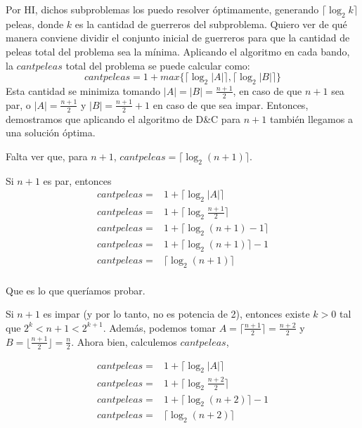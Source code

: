 Por HI, dichos subproblemas los puedo resolver óptimamente, generando $\lceil \log _2 k \rceil$ peleas, donde $k$ es la cantidad de guerreros del subproblema. Quiero ver de qué manera conviene dividir el conjunto inicial de guerreros para que la cantidad de peleas total del problema sea la mínima.
Aplicando el algoritmo en cada bando, la $cantpeleas$ total del problema se puede calcular como: 
\[ cantpeleas = 1 + max\{ \lceil \log _2 |A| \rceil , \lceil \log _2 |B| \rceil \}\]
Esta cantidad se minimiza tomando $|A| = |B| = \frac{n+1}{2}$, en caso de que $n+1$ sea par, o $|A| = \frac{n+1}{2}$ y $|B| = \frac{n+1}{2} + 1$ en caso de que sea impar. Entonces, demostramos que aplicando el algoritmo de D\&C para $n+1$ también llegamos a una solución óptima.

Falta ver que, para $n+1$,  $cantpeleas = \lceil \log _2 (n+1) \rceil$.

Si $n+1$ es par, entonces
  \begin{equation}
  \begin{aligned}
  cantpeleas =& 1 + \lceil \log _2 |A| \rceil \\
  cantpeleas =& 1 + \lceil \log _2 \frac{n+1}{2} \rceil \\
  cantpeleas =& 1 + \lceil \log _2 (n+1)  - 1 \rceil \\
  cantpeleas =& 1 + \lceil \log _2 (n+1) \rceil  - 1 \\
  cantpeleas =& \lceil \log _2 (n+1) \rceil \\
  \end{aligned}
  \end{equation}

Que es lo que queríamos probar.

Si $n + 1$ es impar (y por lo tanto, no es potencia de 2), entonces existe $k > 0$ tal que $2^k < n + 1 < 2^{k+1}$.
Además, podemos tomar
  $A = \lceil \frac{n+1}{2} \rceil = \frac{n+2}{2}$ y
  $B = \lfloor \frac{n+1}2 \rfloor = \frac{n}2$.
Ahora bien, calculemos $cantpeleas$,

  \begin{equation}
  \begin{aligned}
  cantpeleas =& 1 + \lceil \log _2 |A| \rceil \\
  cantpeleas =& 1 + \lceil \log _2 \frac{n+2}{2} \rceil \\
  cantpeleas =& 1 + \lceil \log _2 (n+2) \rceil  - 1 \\
  cantpeleas =& \lceil \log _2 (n+2) \rceil \\
  \end{aligned}
  \end{equation}

